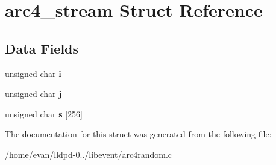 \section{arc4\-\_\-stream \-Struct \-Reference}
\label{structarc4__stream}
\subsection*{\-Data \-Fields}
\begin{DoxyCompactItemize}
\item 
unsigned char {\bfseries i}\label{structarc4__stream_a01494b8fd5801ba9e205324f4b1545ea}

\item 
unsigned char {\bfseries j}\label{structarc4__stream_aac1217779551b743f5645c17740178e3}

\item 
unsigned char {\bfseries s} [256]\label{structarc4__stream_a907653331d178840b86b046257365280}

\end{DoxyCompactItemize}


\-The documentation for this struct was generated from the following file\-:\begin{DoxyCompactItemize}
\item 
/home/evan/lldpd-\/0../libevent/arc4random.\-c\end{DoxyCompactItemize}
